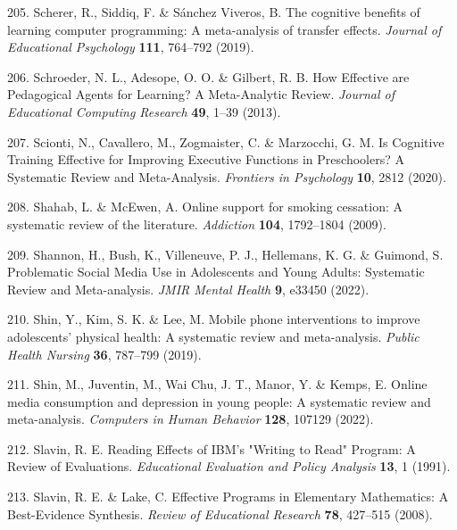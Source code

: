 \documentclass[
  english,
  man]{apa6}
\newenvironment{cslreferences}%
  {}%
  {\par}
\begin{document}
\begin{cslreferences}
\leavevmode\hypertarget{ref-schererCognitiveBenefitsLearning2019}{}%
205. Scherer, R., Siddiq, F. \& Sánchez Viveros, B. The cognitive benefits of learning computer programming: A meta-analysis of transfer effects. \emph{Journal of Educational Psychology} \textbf{111}, 764--792 (2019).

\leavevmode\hypertarget{ref-schroederHowEffectiveAre2013}{}%
206. Schroeder, N. L., Adesope, O. O. \& Gilbert, R. B. How Effective are Pedagogical Agents for Learning? A Meta-Analytic Review. \emph{Journal of Educational Computing Research} \textbf{49}, 1--39 (2013).

\leavevmode\hypertarget{ref-sciontiCognitiveTrainingEffective2020}{}%
207. Scionti, N., Cavallero, M., Zogmaister, C. \& Marzocchi, G. M. Is Cognitive Training Effective for Improving Executive Functions in Preschoolers? A Systematic Review and Meta-Analysis. \emph{Frontiers in Psychology} \textbf{10}, 2812 (2020).

\leavevmode\hypertarget{ref-shahabOnlineSupportSmoking2009}{}%
208. Shahab, L. \& McEwen, A. Online support for smoking cessation: A systematic review of the literature. \emph{Addiction} \textbf{104}, 1792--1804 (2009).

\leavevmode\hypertarget{ref-shannonProblematicSocialMedia2022}{}%
209. Shannon, H., Bush, K., Villeneuve, P. J., Hellemans, K. G. \& Guimond, S. Problematic Social Media Use in Adolescents and Young Adults: Systematic Review and Meta-analysis. \emph{JMIR Mental Health} \textbf{9}, e33450 (2022).

\leavevmode\hypertarget{ref-shinMobilePhoneInterventions2019}{}%
210. Shin, Y., Kim, S. K. \& Lee, M. Mobile phone interventions to improve adolescents' physical health: A systematic review and meta-analysis. \emph{Public Health Nursing} \textbf{36}, 787--799 (2019).

\leavevmode\hypertarget{ref-shinOnlineMediaConsumption2022}{}%
211. Shin, M., Juventin, M., Wai Chu, J. T., Manor, Y. \& Kemps, E. Online media consumption and depression in young people: A systematic review and meta-analysis. \emph{Computers in Human Behavior} \textbf{128}, 107129 (2022).

\leavevmode\hypertarget{ref-slavinReadingEffectsIBM1991}{}%
212. Slavin, R. E. Reading Effects of IBM's "Writing to Read" Program: A Review of Evaluations. \emph{Educational Evaluation and Policy Analysis} \textbf{13}, 1 (1991).

\leavevmode\hypertarget{ref-slavinEffectiveProgramsElementary2008}{}%
213. Slavin, R. E. \& Lake, C. Effective Programs in Elementary Mathematics: A Best-Evidence Synthesis. \emph{Review of Educational Research} \textbf{78}, 427--515 (2008).


\end{cslreferences}
\end{document}
